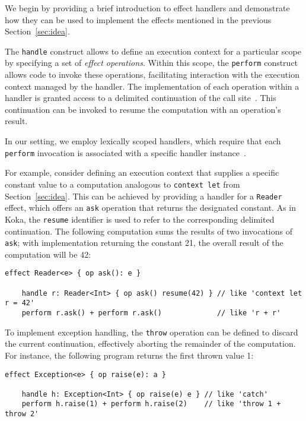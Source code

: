 \documentclass[acmsmall,review,screen]{acmart}
\begin{document}
We begin by providing a brief introduction to effect handlers and demonstrate how they can be used to implement the effects mentioned in the previous Section~\ref{sec:idea}.

The \lstinline[language=colang]{handle} construct allows to define an execution context for a particular scope by specifying a set of \emph{effect operations}.
Within this scope, the \lstinline[language=colang]{perform} construct allows code to invoke these operations, facilitating interaction with the execution context managed by the handler.
The implementation of each operation within a handler is granted access to a delimited continuation of the call site~\cite{dyvbig2007monadic}.
This continuation can be invoked to resume the computation with an operation's result.

In our setting, we employ lexically scoped handlers, which require that each \lstinline[language=colang]{perform} invocation is associated with a specific handler instance~\cite{biernacki2019binders, brachthauser2020effects}.

For example, consider defining an execution context that supplies a specific constant value to a computation analogous to \lstinline[language=colang]{context let} from Section~\ref{sec:idea}.
This can be achieved by providing a handler for a \lstinline[language=colang]{Reader} effect, which offers an \lstinline[language=colang]{ask} operation that returns the designated constant.
As in Koka, the \lstinline[language=colang]{resume} identifier is used to refer to the corresponding delimited continuation.
The following computation sums the results of two invocations of \lstinline[language=colang]{ask}; with implementation returning the constant 21, the overall result of the computation will be 42:
\begin{lstlisting}[language=colang]
    effect Reader<e> { op ask(): e }

    handle r: Reader<Int> { op ask() resume(42) } // like 'context let r = 42'
    perform r.ask() + perform r.ask()             // like 'r + r'
\end{lstlisting}

To implement exception handling, the \texttt{throw} operation can be defined to discard the current continuation, effectively aborting the remainder of the computation.
For instance, the following program returns the first thrown value 1:
\begin{lstlisting}[language=colang]
    effect Exception<e> { op raise(e): a }

    handle h: Exception<Int> { op raise(e) e } // like 'catch'
    perform h.raise(1) + perform h.raise(2)    // like 'throw 1 + throw 2'
\end{lstlisting}
\end{document}
